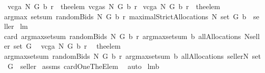\begin{isabellebody}
\isamarkupfalse%
\ {\isachardoublequoteopen}vcga\ N\ G\ b\ r\ {\isacharequal}{\isacharequal}\ the{\isacharunderscore}elem\ {\isacharparenleft}vcgas\ N\ G\ b\ r{\isacharparenright}{\isachardoublequoteclose}\isanewline
{}\isamarkupfalse%
\ {\isachardoublequoteopen}vcga{\isacharprime}\ N\ G\ b\ r\ {\isacharequal}{\isacharequal}\ {\isacharparenleft}the{\isacharunderscore}elem\isanewline
{\isacharparenleft}argmax\ {\isacharparenleft}setsum\ {\isacharparenleft}randomBids{\isacharprime}\ N\ G\ b\ r{\isacharparenright}{\isacharparenright}\ {\isacharparenleft}maximalStrictAllocations{\isacharprime}\ N\ {\isacharparenleft}set\ G{\isacharparenright}\ b{\isacharparenright}{\isacharparenright}{\isacharparenright}\ {\isacharminus}{\isacharminus}\ seller{\isachardoublequoteclose}\isanewline
\isanewline
{}\isamarkupfalse%
\ lm{}{}{}{\isacharcolon}\ \ \isanewline
{\isachardoublequoteopen}card\ {\isacharparenleft}{\isacharparenleft}argmax{\isasymcirc}setsum{\isacharparenright}\ {\isacharparenleft}randomBids{\isacharprime}\ N\ G\ b\ r{\isacharparenright}\ {\isacharparenleft}{\isacharparenleft}argmax{\isasymcirc}setsum{\isacharparenright}\ b\ {\isacharparenleft}allAllocations\ {\isacharparenleft}N{\isasymunion}{\isacharbraceleft}seller{\isacharbraceright}{\isacharparenright}\ {\isacharparenleft}set\ G{\isacharparenright}{\isacharparenright}{\isacharparenright}{\isacharparenright}{\isacharequal}{}{\isachardoublequoteclose}\ \isanewline
{}\ {\isachardoublequoteopen}vcga\ N\ G\ b\ r\ {\isacharequal}\ \isanewline
{\isacharparenleft}the{\isacharunderscore}elem\isanewline
{\isacharparenleft}{\isacharparenleft}argmax{\isasymcirc}setsum{\isacharparenright}\ {\isacharparenleft}randomBids{\isacharprime}\ N\ G\ b\ r{\isacharparenright}\ {\isacharparenleft}{\isacharparenleft}argmax{\isasymcirc}setsum{\isacharparenright}\ b\ {\isacharparenleft}allAllocations\ {\isacharparenleft}{\isacharbraceleft}seller{\isacharbraceright}{\isasymunion}N{\isacharparenright}\ {\isacharparenleft}set\ G{\isacharparenright}{\isacharparenright}{\isacharparenright}{\isacharparenright}{\isacharparenright}\ {\isacharminus}{\isacharminus}\ seller{\isachardoublequoteclose}\isanewline
%
\isadelimproof
%
\endisadelimproof
%
\isatagproof
{}\isamarkupfalse%
\ assms\ cardOneTheElem\ \isamarkupfalse%
\ auto%
\endisatagproof
{\isafoldproof}%
%
\isadelimproof
\isanewline
%
\endisadelimproof
\isanewline
{}\isamarkupfalse%
\ lm{}{}{}b{\isacharcolon}\ \ \isanewline

\end{isabellebody}

